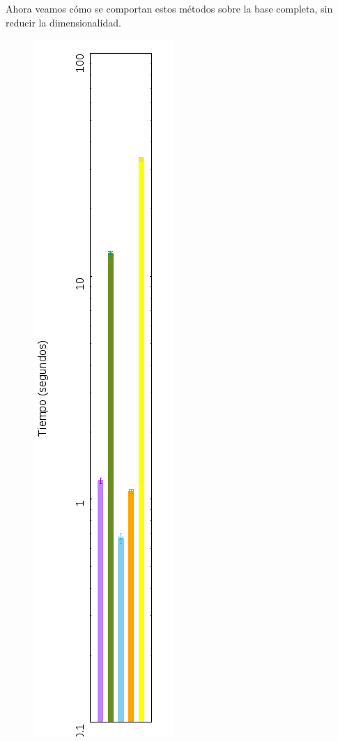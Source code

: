 \documentclass[10pt, a4paper]{article}
\begin{document}
Ahora veamos cómo se comportan estos métodos sobre la base completa, sin reducir la dimensionalidad.

\begin{figure}[H]
  \includegraphics[scale=0.6,angle=-90]{../src/data/tm.png}
\end{figure}
\end{document}

